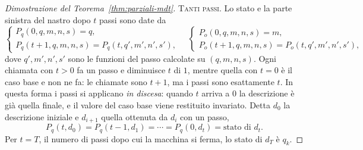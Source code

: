 \documentclass[a4paper, 11pt, oneside]{book}
\theoremstyle{formale}
\begin{document}
\begin{proof}[Dimostrazione del Teorema~\ref{thm:parziali-mdt}]
        \medskip
        \textsc{Tanti passi}. Lo stato e la parte sinistra del nastro dopo $t$ passi
        sono date da
        \begin{equation*}
            \begin{cases}
                P_q(0, q, m, n, s) = q, \\
                P_q(t + 1, q, m, n, s) = P_q(t, q', m', n', s'),
            \end{cases}
            \quad
            \begin{cases}
                P_o(0, q, m, n, s) = m, \\
                P_o(t + 1, q, m, n, s) = P_o(t, q', m', n', s'),
            \end{cases}
        \end{equation*}
        dove $q', m', n', s'$ sono le funzioni del passo calcolate su $(q, m, n, s)$.
        Ogni chiamata con $t > 0$ fa un passo e diminuisce $t$ di $1$, mentre quella con
        $t = 0$ \`e il caso base e non ne fa: le chiamate sono $t + 1$, ma i passi sono
        esattamente $t$. In questa forma i passi si applicano \emph{in discesa}: quando
        $t$ arriva a $0$ la descrizione \`e gi\`a quella finale, e il valore del caso base
        viene restituito invariato. Detta $d_0$ la descrizione iniziale e
        $d_{i+1}$ quella ottenuta da $d_i$ con un passo,
        \begin{equation*}
            P_q(t, d_0) = P_q(t - 1, d_1) = \cdots = P_q(0, d_t) = \text{stato di } d_t.
        \end{equation*}
        Per $t = T$, il numero di passi dopo cui la macchina si ferma, lo stato di $d_T$
        \`e $q_k$.


\end{proof}
\end{document}
